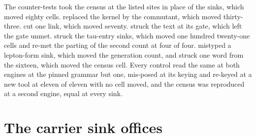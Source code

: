 \begin{chproof}[census]
The counter-tests took the census at the listed sites in place of the sinks, which moved eighty cells. replaced the kernel by the commutant, which moved thirty-three. cut one link, which moved seventy. struck the text at its gate, which left the gate unmet. struck the tau-entry sinks, which moved one hundred twenty-one cells and re-met the parting of the second count at four of four. mistyped a lepton-form sink, which moved the generation count, and struck one word from the sixteen, which moved the census cell. Every control read the same at both engines at the pinned grammar but one, mis-posed at its keying and re-keyed at a new tool at eleven of eleven with no cell moved, and the census was reproduced at a second engine, equal at every sink.
\end{chproof}
\section{The carrier sink offices}\label{mod:IV-3-D540063-cbsk-t1}

